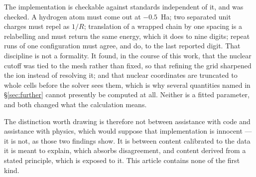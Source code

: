 \documentclass[11pt]{article}
\begin{document}
The implementation is checkable against standards independent of it, and was checked. A hydrogen
atom must come out at $-0.5$~Ha; two separated unit charges must repel as $1/R$; translation of a
wrapped chain by one spacing is a relabelling and must return the same energy, which it does to nine
digits; repeat runs of one configuration must agree, and do, to the last reported digit. That
discipline is not a formality. It found, in the course of this work, that the nuclear cutoff was
tied to the mesh rather than fixed, so that refining the grid sharpened the ion instead of resolving
it; and that nuclear coordinates are truncated to whole cells before the solver sees them, which is
why several quantities named in \S\ref{sec:further} cannot presently be computed at all. Neither is a fitted
parameter, and both changed what the calculation means.

The distinction worth drawing is therefore not between assistance with code and assistance with
physics, which would suppose that implementation is innocent --- it is not, as those two findings
show. It is between content calibrated to the data it is meant to explain, which absorbs
disagreement, and content derived from a stated principle, which is exposed to it. This article
contains none of the first kind.
\end{document}
